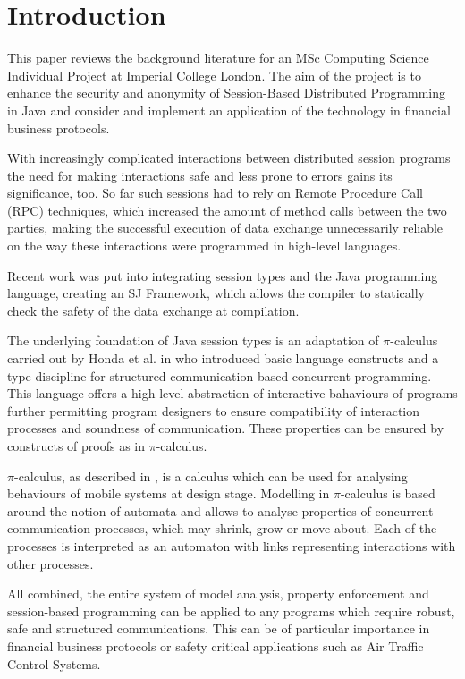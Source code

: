 \chapter{Introduction}
\label{sec:intro}

This paper reviews the background literature for an MSc Computing Science Individual Project at Imperial College London. The aim of the project is to enhance the security and anonymity of Session-Based Distributed Programming in Java and consider and implement an application of the technology in financial business protocols.

With increasingly complicated interactions between distributed session programs the need for making interactions safe and less prone to errors gains its significance, too. So far such sessions had to rely on Remote Procedure Call (RPC) techniques, which increased the amount of method calls between the two parties, making the successful execution of data exchange unnecessarily reliable on the way these interactions were programmed in high-level languages.

Recent work was put into integrating session types and the Java programming language, creating an SJ Framework, which allows the compiler to statically check the safety of the data exchange at compilation\cite{sessionbased_programming}.

The underlying foundation of Java session types is an adaptation of $\pi$-calculus carried out by Honda et al. in \cite{language_primitives} who introduced basic language constructs and a type discipline for structured communication-based concurrent programming. This language offers a high-level abstraction of interactive bahaviours of programs further permitting program designers to ensure compatibility of interaction processes and soundness of communication. These properties can be ensured by constructs of proofs as in $\pi$-calculus.

$\pi$-calculus, as described in \cite{pi-calculus}, is a calculus which can be used for analysing behaviours of mobile systems at design stage. Modelling in $\pi$-calculus is based around the notion of automata and allows to analyse properties of concurrent communication processes, which may shrink, grow or move about. Each of the processes is interpreted as an automaton with links representing interactions with other processes.

All combined, the entire system of model analysis, property enforcement and session-based programming can be applied to any programs which require robust, safe and structured communications. This can be of particular importance in financial business protocols or safety critical applications such as Air Traffic Control Systems.

